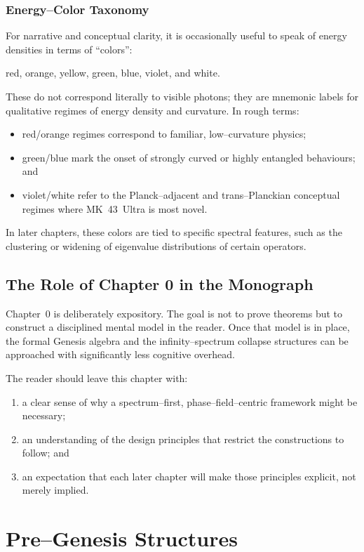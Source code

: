 \subsection{Energy--Color Taxonomy}
For narrative and conceptual clarity, it is occasionally useful to speak of
energy densities in terms of ``colors'':
\begin{center}
  red, orange, yellow, green, blue, violet, and white.
\end{center}
These do not correspond literally to visible photons; they are mnemonic
labels for qualitative regimes of energy density and curvature. In rough
terms:
\begin{itemize}
  \item red/orange regimes correspond to familiar, low--curvature physics;
  \item green/blue mark the onset of strongly curved or highly entangled
        behaviours; and
  \item violet/white refer to the Planck--adjacent and trans--Planckian
        conceptual regimes where MK~43~Ultra is most novel.
\end{itemize}
In later chapters, these colors are tied to specific spectral features, such
as the clustering or widening of eigenvalue distributions of certain
operators.

\section{The Role of Chapter 0 in the Monograph}
Chapter~0 is deliberately expository. The goal is not to prove theorems but
to construct a disciplined mental model in the reader. Once that model is in
place, the formal Genesis algebra and the infinity--spectrum collapse
structures can be approached with significantly less cognitive overhead.

The reader should leave this chapter with:
\begin{enumerate}
  \item a clear sense of why a spectrum--first, phase--field--centric
        framework might be necessary;
  \item an understanding of the design principles that restrict the
        constructions to follow; and
  \item an expectation that each later chapter will make those principles
        explicit, not merely implied.
\end{enumerate}

\chapter{Pre--Genesis Structures}
\label{ch:pre-genesis}

